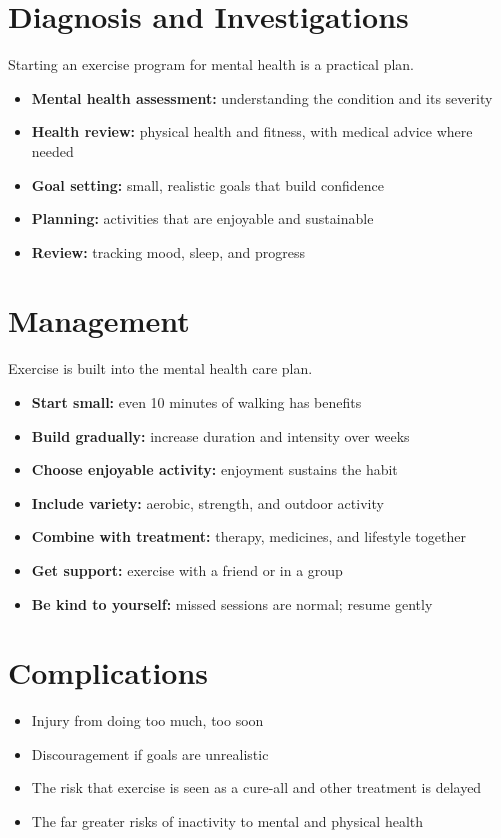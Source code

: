 \section*{Diagnosis and Investigations}
Starting an exercise program for mental health is a practical plan.
\begin{itemize}
    \item \textbf{Mental health assessment:} understanding the condition and its severity
    \item \textbf{Health review:} physical health and fitness, with medical advice where needed
    \item \textbf{Goal setting:} small, realistic goals that build confidence
    \item \textbf{Planning:} activities that are enjoyable and sustainable
    \item \textbf{Review:} tracking mood, sleep, and progress
\end{itemize}

\section*{Management}
Exercise is built into the mental health care plan.
\begin{itemize}
    \item \textbf{Start small:} even 10 minutes of walking has benefits
    \item \textbf{Build gradually:} increase duration and intensity over weeks
    \item \textbf{Choose enjoyable activity:} enjoyment sustains the habit
    \item \textbf{Include variety:} aerobic, strength, and outdoor activity
    \item \textbf{Combine with treatment:} therapy, medicines, and lifestyle together
    \item \textbf{Get support:} exercise with a friend or in a group
    \item \textbf{Be kind to yourself:} missed sessions are normal; resume gently
\end{itemize}

\section*{Complications}
\begin{itemize}
    \item Injury from doing too much, too soon
    \item Discouragement if goals are unrealistic
    \item The risk that exercise is seen as a cure-all and other treatment is delayed
    \item The far greater risks of inactivity to mental and physical health
\end{itemize}


